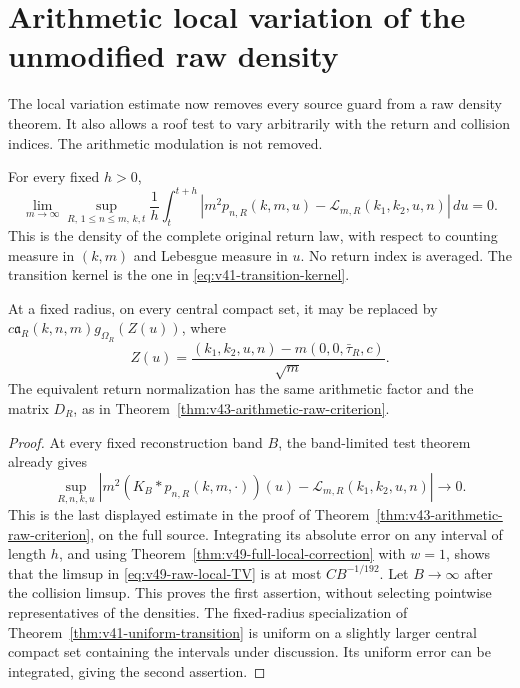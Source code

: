 \section{Arithmetic local variation of the unmodified raw density}
\label{sec:v49-raw-local-TV}
The local variation estimate now removes every source guard from a
raw density theorem. It also allows a roof test to vary arbitrarily
with the return and collision indices. The arithmetic modulation is
not removed.

\begin{theorem}
\label{thm:v49-raw-local-TV}
For every fixed $h>0$,
\begin{equation}\label{eq:v49-raw-local-TV}
 \lim_{m\to\infty}\sup_{R,\,1\le n\le m,\,k,t}
 \frac1h\int_t^{t+h}
 \left|m^2p_{n,R}(k,m,u)
       -\mathcal L_{m,R}(k_1,k_2,u,n)\right|\,du=0.
\end{equation}
This is the density of the complete original return law, with respect
to counting measure in $(k,m)$ and Lebesgue measure in $u$.
No return index is averaged. The transition kernel is the one in
\eqref{eq:v41-transition-kernel}.

At a fixed radius, on every central compact set, it may be replaced
by $c\mathfrak a_R(k,n,m)g_{\Omega_R}(Z(u))$, where
\[
 Z(u)=\frac{(k_1,k_2,u,n)-m(0,0,\bar\tau_R,c)}{\sqrt m}.
\]
The equivalent return normalization has the same arithmetic factor
and the matrix $D_R$, as in
Theorem~\ref{thm:v43-arithmetic-raw-criterion}.
\end{theorem}
\begin{proof}
At every fixed reconstruction band $B$, the band-limited test theorem
already gives
\[
 \sup_{R,n,k,u}\left|m^2(K_B*p_{n,R}(k,m,\cdot))(u)
                 -\mathcal L_{m,R}(k_1,k_2,u,n)\right|\longrightarrow0.
\]
This is the last displayed estimate in the proof of
Theorem~\ref{thm:v43-arithmetic-raw-criterion}, on the full source.
Integrating its absolute error on any interval of length $h$, and
using Theorem~\ref{thm:v49-full-local-correction} with $w=1$, shows
that the limsup in \eqref{eq:v49-raw-local-TV} is at most
$CB^{-1/192}$. Let $B\to\infty$ after the collision limsup. This
proves the first assertion, without selecting pointwise representatives
of the densities. The fixed-radius specialization of
Theorem~\ref{thm:v41-uniform-transition} is uniform on a slightly
larger central compact set containing the intervals under discussion.
Its uniform error can be integrated, giving the second assertion.
\end{proof}

